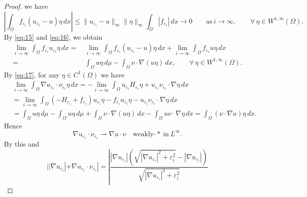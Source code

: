 \documentclass{amsart}
\theoremstyle{definition}
\begin{document}
\begin{proof}
we have
\begin{equation}\label{eq:16}
\left| \int_{\Omega} f_{\varepsilon _i}  (u_{\varepsilon_i } -u) \eta \, dx \right|
\leq \| u_{\varepsilon_i} -u \|_\infty  \| \eta \|_\infty
\int_{\Omega} |f_{\varepsilon _i}  | \, dx \to 0 \qquad 
\text{as} \ i \to \infty,\qquad \forall \, \eta \in W^{1,\infty} (\Omega).
\end{equation}
By \eqref{eq:15} and \eqref{eq:16}, we obtain
\begin{equation}\label{eq:17}
\begin{split}
\lim_{i\to \infty} \int_{\Omega}
f_{\varepsilon_i}  u_{\varepsilon_i} \eta \, dx
=& \,
\lim_{i\to \infty}
\int_{\Omega}
f_{\varepsilon_i}  (u_{\varepsilon_i}-u) \eta \, dx
+
\lim_{i\to \infty}
\int_{\Omega}
f_{\varepsilon_i}  u \eta \, dx \\
=& \,
\int_{\Omega} u\eta \, d\mu
- \int_{\Omega} \nu \cdot \nabla (u\eta)\, dx,
\qquad \forall \, \eta \in W^{1,\infty} (\Omega).
\end{split}
\end{equation}
By \eqref{eq:17}, for any $\eta \in C^1 (\Omega)$ we have
\begin{equation}
\begin{split}
&\lim_{i\to \infty} \int_{\Omega} \nabla u_{\varepsilon _i} \cdot \nu_{\varepsilon _i} \eta \,dx
= 
-\lim_{i\to \infty} \int_{\Omega} u_{\varepsilon _i} H_{\varepsilon_i} \eta +u_{\varepsilon_i} \nu_{\varepsilon _i} \cdot \nabla \eta \,dx \\
&= 
\lim_{i\to \infty} \int_{\Omega} (-H_{\varepsilon_i} + f_{\varepsilon_i} ) u_{\varepsilon _i} \eta -  f_{\varepsilon_i}  u_{\varepsilon _i} \eta
-u_{\varepsilon_i} \nu_{\varepsilon _i} \cdot \nabla \eta \,dx \\
&=  \int_{\Omega} u\eta \, d\mu - \int_{\Omega} u\eta \, d\mu + \int_{\Omega} \nu \cdot \nabla (u\eta) \, dx - \int_{\Omega} u \nu \cdot \nabla \eta \, dx
= \int_{\Omega} (\nu \cdot \nabla u) \eta \, dx.
\end{split}
\end{equation}
Hence 
\begin{equation}
\nabla u_{\varepsilon _i} \cdot \nu_{\varepsilon _i} \rightharpoonup \nabla u \cdot \nu
\quad \text{weakly-}\ast \ \text{in} \ L^\infty.
\end{equation}
By this and
\[
| | \nabla u_{\varepsilon_i} | + \nabla u_{\varepsilon _i} \cdot \nu_{\varepsilon _i} |
= \left| 
\frac{ |\nabla u _{\varepsilon _i}| ( \sqrt{ |\nabla u_{\varepsilon_i}|^2 + \varepsilon _i ^2 }-|\nabla u_{\varepsilon_i}| )  }{\sqrt{ |\nabla u_{\varepsilon_i}|^2 + \varepsilon _i ^2 }}
\]
\end{proof}
\end{document}
